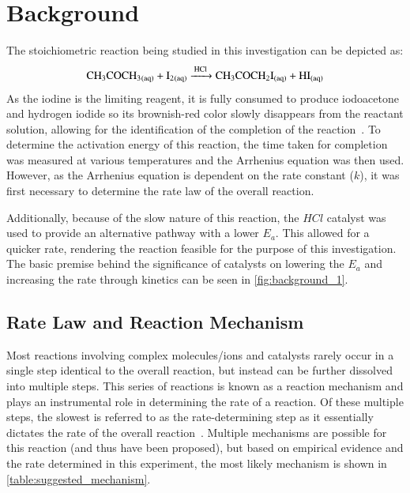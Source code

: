 \section{Background}
The stoichiometric reaction being studied in this investigation can be depicted as:
\[\ce{CH3COCH3_{(aq)} + I2_{(aq)} ->[HCl] CH3COCH2I_{(aq)} + HI_{(aq)}}\]
As the iodine is the limiting reagent, it is fully consumed to produce iodoacetone and hydrogen iodide so its brownish-red color slowly disappears from the reactant solution, allowing for the identification of the completion of the reaction~\parencite{other_literature_2, iodoacetone}. To determine the activation energy of this reaction, the time taken for completion was measured at various temperatures and the Arrhenius equation was then used. However, as the Arrhenius equation is dependent on the rate constant ($k$), it was first necessary to determine the rate law of the overall reaction.

Additionally, because of the slow nature of this reaction, the $HCl$ catalyst was used to provide an alternative pathway with a lower $E_a$. This allowed for a quicker rate, rendering the reaction feasible for the purpose of this investigation. The basic premise behind the significance of catalysts on lowering the $E_a$ and increasing the rate through kinetics can be seen in \cref{fig:background_1}.



\subsection{Rate Law and Reaction Mechanism}
Most reactions involving complex molecules/ions and catalysts rarely occur in a single step identical to the overall reaction, but instead can be further dissolved into multiple steps. This series of reactions is known as a reaction mechanism and plays an instrumental role in determining the rate of a reaction. Of these multiple steps, the slowest is referred to as the rate-determining step as it essentially dictates the rate of the overall reaction~\parencite{mechanism_information_ketone}. Multiple mechanisms are possible for this reaction (and thus have been proposed), but based on empirical evidence and the rate determined in this experiment, the most likely mechanism is shown in \cref{table:suggested_mechanism}.

